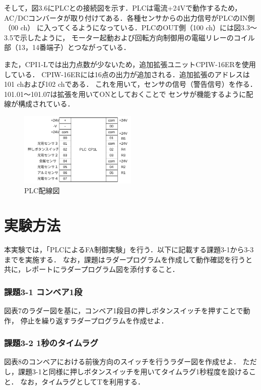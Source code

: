 そして，図3.6にPLCとの接続図を示す．PLCは電流+24Vで動作するため，
AC/DCコンバータが取り付けてある．各種センサからの出力信号がPLCのIN側（00 ch）
に入ってくるようになっている．PLCのOUT側（100 ch）には図3.3～3.5で示したように，
モーター起動および回転方向制御用の電磁リレーのコイル部（13，14番端子）とつながっている．

また，CPI1-Lでは出力点数が少ないため，追加拡張ユニットCPIW-16ERを使用している．
CPIW-16ERには16点の出力が追加される．追加拡張のアドレスは101 chおよび102 chである．
これを用いて，センサの信号（警告信号）を作る．101.01～101.07は拡張を用いてONとしておくことで
センサが機能するように配線が構成されている．

\begin{figure}[H]
  \centering
  \includegraphics[width=0.5\textwidth]{sozai/11.pdf}
  \caption{PLC配線図}
\end{figure}

\section{実験方法}
本実験では，「PLCによるFA制御実験」を行う．以下に記載する課題3-1から3-3までを実施する．
なお，課題はラダープログラムを作成して動作確認を行うと共に，レポートにラダープログラム図を添付すること．

\subsubsection*{課題3-1 コンベア1段}
図表7のラダー図を基に，コンベア1段目の押しボタンスイッチを押すことで動作，
停止を繰り返すラダープログラムを作成せよ．

\subsubsection*{課題3-2 1秒のタイムラグ}
図表8のコンベアにおける前後方向のスイッチを行うラダー図を作成せよ．
ただし，課題3-1と同様に押しボタンスイッチを用いてタイムラグ1秒程度を設けること．
なお，タイムラグとしてTを利用する．


